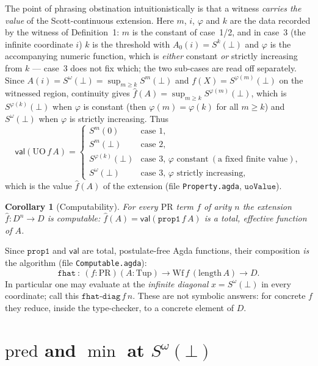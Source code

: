 \documentclass[11pt]{article}
\newcommand{\PR}{\mathrm{PR}}
\newcommand{\UO}{\mathrm{UO}}
\newcommand{\uoValue}{\mathsf{val}}
\newcommand{\Sw}{S^{\omega}(\bot)}
\newcommand{\D}{D}
\newcommand{\hatf}{\hat f}
\newtheorem{corollary}{Corollary}
\begin{document}
The point of phrasing obstination intuitionistically is that a witness
\emph{carries the value} of the Scott-continuous extension. Here $m$, $i$,
$\varphi$ and $k$ are the data recorded by the witness of Definition~1: $m$ is
the constant of case~1/2, and in case~3 (the infinite coordinate $i$) $k$ is
the threshold with $A_0(i)=S^k(\bot)$ and $\varphi$ is the accompanying numeric
function, which is \emph{either} constant \emph{or} strictly increasing from
$k$ --- case~3 does not fix which; the two sub-cases are read off separately.
Since $A(i)=\Sw=\sup_{m\ge k}S^m(\bot)$ and $f(X)=S^{\varphi(m)}(\bot)$ on the
witnessed region, continuity gives
$\hatf(A)=\sup_{m\ge k}S^{\varphi(m)}(\bot)$, which is $S^{\varphi(k)}(\bot)$
when $\varphi$ is constant (then $\varphi(m)=\varphi(k)$ for all $m\ge k$) and
$\Sw$ when $\varphi$ is strictly increasing. Thus
\[
  \uoValue(\UO\,f\,A)=
  \begin{cases}
    S^m(0) & \text{case 1},\\
    S^m(\bot) & \text{case 2},\\
    S^{\varphi(k)}(\bot) & \text{case 3, }\varphi\text{ constant}
      \ (\text{a fixed finite value}),\\
    \Sw & \text{case 3, }\varphi\text{ strictly increasing},
  \end{cases}
\]
which is the value $\hatf(A)$ of the extension (file \texttt{Property.agda},
$\mathtt{uoValue}$).

\begin{corollary}[Computability]
For every $\PR$ term $f$ of arity $n$ the extension $\hatf\colon\D^n\to\D$ is
computable: $\hatf(A)=\uoValue(\mathtt{prop1}\,f\,A)$ is a total, effective
function of $A$.
\end{corollary}

Since $\mathtt{prop1}$ and $\uoValue$ are total, postulate-free Agda functions,
their composition \emph{is} the algorithm (file \texttt{Computable.agda}):
\[
  \mathtt{fhat}\ :\ (f:\PR)(A:\mathrm{Tup})\to\mathrm{Wf}\,f\,(\mathrm{length}\,A)\to\D .
\]
In particular one may evaluate at the \emph{infinite diagonal} $x=\Sw$ in every
coordinate; call this $\mathtt{fhat\text{-}diag}\,f\,n$. These are not symbolic
answers: for concrete $f$ they reduce, inside the type-checker, to a concrete
element of $\D$.

\section{$\mathrm{pred}$ and $\min$ at $\Sw$}
\end{document}
